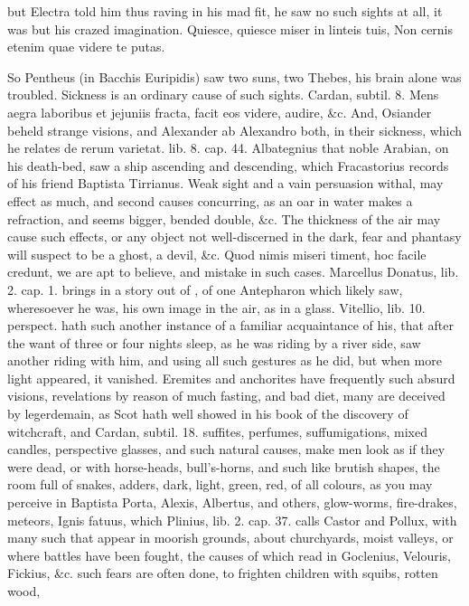 {but Electra told him thus raving in his mad fit, he saw no such sights
at all, it was but his crazed imagination.
Quiesce, quiesce miser in linteis tuis,
Non cernis etenim quae videre te putas.

So Pentheus (in Bacchis Euripidis) saw two suns, two Thebes, his brain
alone was troubled. Sickness is an ordinary cause of such sights.
Cardan, subtil. 8. Mens aegra laboribus et jejuniis fracta, facit eos
videre, audire, \&c. And, Osiander beheld strange visions, and Alexander
ab Alexandro both, in their sickness, which he relates de rerum
varietat. lib. 8. cap. 44. Albategnius that noble Arabian, on his
death-bed, saw a ship ascending and descending, which Fracastorius
records of his friend Baptista Tirrianus. Weak sight and a vain
persuasion withal, may effect as much, and second causes concurring, as
an oar in water makes a refraction, and seems bigger, bended double,
\&c. The thickness of the air may cause such effects, or any object not
well-discerned in the dark, fear and phantasy will suspect to be a
ghost, a devil, \&c. Quod nimis miseri timent, hoc facile credunt,
we are apt to believe, and mistake in such cases. Marcellus Donatus,
lib. 2. cap. 1. brings in a story out of \Aristotle{}, of one Antepharon
which likely saw, wheresoever he was, his own image in the air, as in a
glass. Vitellio, lib. 10. perspect. hath such another instance of a
familiar acquaintance of his, that after the want of three or four
nights sleep, as he was riding by a river side, saw another riding with
him, and using all such gestures as he did, but when more light
appeared, it vanished. Eremites and anchorites have frequently such
absurd visions, revelations by reason of much fasting, and bad diet,
many are deceived by legerdemain, as Scot hath well showed in his book
of the discovery of witchcraft, and Cardan, subtil. 18. suffites,
perfumes, suffumigations, mixed candles, perspective glasses, and such
natural causes, make men look as if they were dead, or with
horse-heads, bull's-horns, and such like brutish shapes, the room full
of snakes, adders, dark, light, green, red, of all colours, as you may
perceive in Baptista Porta, Alexis, Albertus, and others, glow-worms,
fire-drakes, meteors, Ignis fatuus, which Plinius, lib. 2. cap. 37.
calls Castor and Pollux, with many such that appear in moorish grounds,
about churchyards, moist valleys, or where battles have been fought,
the causes of which read in Goclenius, Velouris, Fickius, \&c. such
fears are often done, to frighten children with squibs, rotten wood,
}
